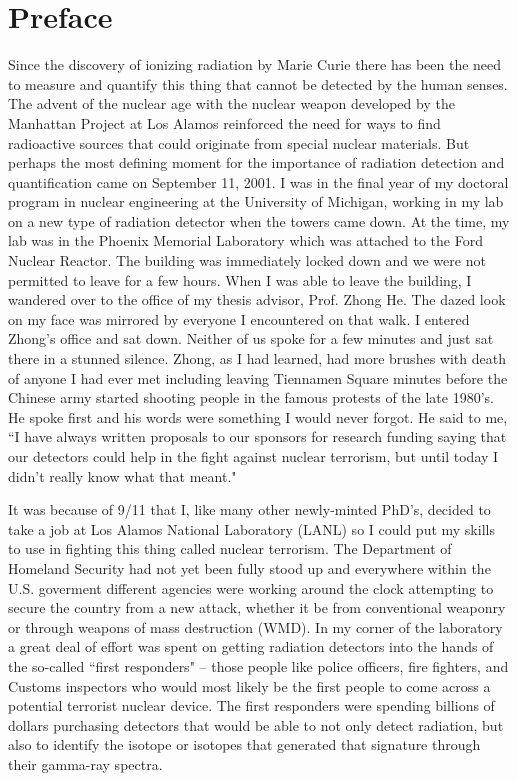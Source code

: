 \chapter{Preface}

Since the discovery of ionizing radiation by Marie Curie there has been the need to measure and quantify this thing that cannot be detected by the human senses.  The advent of the nuclear age with the nuclear weapon developed by the Manhattan Project at Los Alamos reinforced the need for ways to find radioactive sources that could originate from special nuclear materials.  But perhaps the most defining moment for the importance of radiation detection and quantification came on September 11, 2001.  I was in the final year of my doctoral program in nuclear engineering at the University of Michigan, working in my lab on a new type of radiation detector when the towers came down.  At the time, my lab was in the Phoenix Memorial Laboratory which was attached to the Ford Nuclear Reactor.  The building was immediately locked down and we were not permitted to leave for a few hours.  When I was able to leave the building, I wandered over to the office of my thesis advisor, Prof. Zhong He.  The dazed look on my face was mirrored by everyone I encountered on that walk.  I entered Zhong's office and sat down.  Neither of us spoke for a few minutes and just sat there in a stunned silence.  Zhong, as I had learned, had more brushes with death of anyone I had ever met including leaving Tiennamen Square minutes before the Chinese army started shooting people in the famous protests of the late 1980's.  He spoke first and his words were something I would never forgot.  He said to me, ``I have always written proposals to our sponsors for research funding saying that our detectors could help in the fight against nuclear terrorism, but until today I didn't really know what that meant."

It was because of 9/11 that I, like many other newly-minted PhD's, decided to take a job at Los Alamos National Laboratory (LANL) so I could put my skills to use in fighting this thing called nuclear terrorism.  The Department of Homeland Security had not yet been fully stood up and everywhere within the U.S. goverment different agencies were working around the clock attempting to secure the country from a new attack, whether it be from conventional weaponry or through weapons of mass destruction (WMD).  In my corner of the laboratory a great deal of effort was spent on getting radiation detectors into the hands of the so-called ``first responders" -- those people like police officers, fire fighters, and Customs inspectors who would most likely be the first people to come across a potential terrorist nuclear device.  The first responders were spending billions of dollars purchasing detectors that would be able to not only detect radiation, but also to identify the isotope or isotopes that generated that signature through their gamma-ray spectra.

